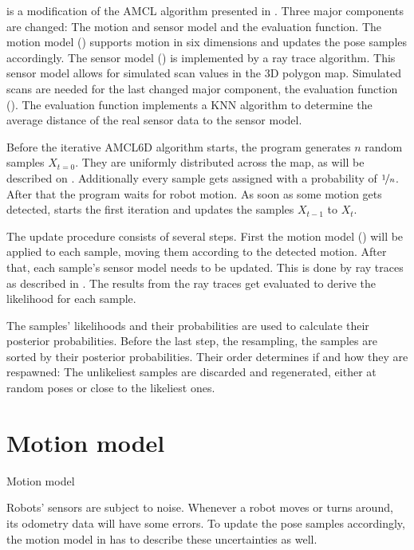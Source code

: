 \documentclass[Thesis.tex]{subfiles}
\begin{document}
%
 is a modification of the \gls{AMCL} algorithm presented in \cite{ThrunBurgardFox:2005}. Three major components are changed: The motion and sensor model and the evaluation function. The motion model () supports motion in six dimensions and updates the pose samples accordingly. The sensor model () is implemented by a ray trace algorithm. This sensor model allows for simulated scan values in the 3D polygon map. Simulated scans are needed for the last changed major component, the evaluation function (). The evaluation function implements a \gls{KNN} algorithm to determine the average distance of the real sensor data to the sensor model.

Before the iterative \gls{AMCL6D} algorithm starts, the program generates $n$ random samples $X_{t=0}$. They are uniformly distributed across the map, as will be described on . Additionally every sample gets assigned with a probability of $\nicefrac{1}{n}$.  After that the program waits for robot motion. As soon as some motion gets detected,  starts the first iteration and updates the samples $X_{t-1}$ to $X_{t}$.

The update procedure consists of several steps. First the motion model () will be applied to each sample, moving them according to the detected motion. After that, each sample's sensor model needs to be updated. This is done by ray traces as described in . The results from the ray traces get evaluated to derive the likelihood for each sample.

The samples' likelihoods and their probabilities are used to calculate their posterior probabilities. Before the last step, the resampling, the samples are sorted by their posterior probabilities. Their order determines if and how they are respawned: The unlikeliest samples are discarded and regenerated, either at random poses or close to the likeliest ones.
%
%
%
%
%
%
\section{Motion model}
%
\begin{algorithm}[!htp]
\caption{Motion model}
\label{alg:motionmodel}

\end{algorithm}
%
Robots' sensors are subject to noise. Whenever a robot moves or turns around, its odometry data will have some errors.
To update the pose samples accordingly, the motion model in  has to describe these uncertainties as well.
\end{document}
